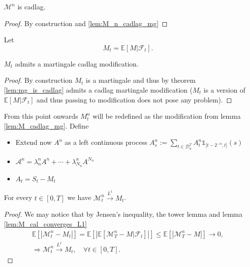 \begin{lemma}\label{lem:M_cal_cadlag}
  $\mathcal{M}^n$ is cadlag.
\end{lemma}
\begin{proof}
  By construction and \ref{lem:M_n_cadlag_mg}
\end{proof}

Let \begin{equation}\label{equation_DM_e6} M_t = \mathbb{E}[M\vert\mathcal{F}_t].\end{equation}

\begin{lemma}\label{lem:M_cadlag_mg}
  $M_t$ admits a martingale cadlag modification.
\end{lemma}
\begin{proof}
  By construction $M_t$ is a martingale and thus by theorem \ref{lem:mg_is_cadlag} admits a cadlag martingale modification
  ($M_t$ is a version of $\mathbb{E}[M\vert\mathcal{F}_t]$ and thus passing to modification does not pose any problem).
\end{proof}

From this point onwards $M^n_t$ will be redefined as the modification from lemma \ref{lem:M_cadlag_mg}.
Define
\begin{itemize}
  \item Extend now $A^n$ as a left continuous process $A^n_s:=\sum_{t\in\mathcal{D}^T_n}A^n_t\mathbb{1}_{]t-2^{-n},t]}(s)$
  \item $\mathcal{A}^n=\lambda^n_nA^n+\cdots +\lambda^n_{N_n}A^{N_n}$
  \item $A_t=S_t-M_t$
\end{itemize}

\begin{lemma}\label{lem:M1_komlos}
  For every $t\in[0,T]$ we have $\mathcal{M}^n_t\stackrel{L^1}{\rightarrow}M_t$.
\end{lemma}
\begin{proof}
  We may notice that by Jensen's inequality, the tower lemma and lemma \ref{lem:M_cal_converges_L1}
  \begin{gather}\nonumber
    \mathbb{E}[|\mathcal{M}^n_t-M_t|]=\mathbb{E}[|\mathbb{E}[\mathcal{M}^n_T-M\vert\mathcal{F}_t]|]\leq \mathbb{E}[|\mathcal{M}^n_T-M|]\rightarrow0,\\
    \Rightarrow\mathcal{M}^n_t\stackrel{L^1}{\rightarrow} M_t,\quad \forall t\in[0,T].\label{equation_DM_e7}
  \end{gather}
\end{proof}

